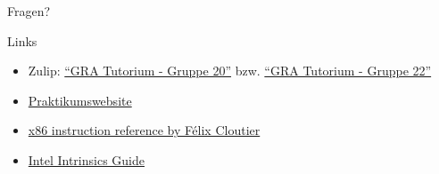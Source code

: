 \documentclass[
  german,            %
  aspectratio=169,    %
]{tumbeamer}
\begin{document}
\begin{frame}[c]{}{}
  \begin{center}
    \LARGE Fragen?
  \end{center}
\end{frame}

\begin{frame}[fragile, c]{Links}{}
  \begin{itemize}
    \item Zulip: \href{https://zulip.in.tum.de/#narrow/stream/2267-GRA-Tutorium---Gruppe-20}{\enquote{GRA Tutorium - Gruppe 20}}
          bzw. \href{https://zulip.in.tum.de/#narrow/stream/2269-GRA-Tutorium---Gruppe-22}{\enquote{GRA Tutorium - Gruppe 22}}
    \item \href{https://gra.caps.in.tum.de}{Praktikumswebsite}
    \item \href{https://www.felixcloutier.com/x86/}{x86 instruction reference by Félix Cloutier}
    \item \href{https://www.intel.com/content/www/us/en/docs/intrinsics-guide/index.html#}{Intel Intrinsics Guide}
  \end{itemize}
\end{frame}

\maketitle
\end{document}
